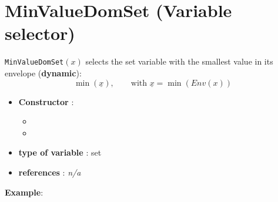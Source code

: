 \section{MinValueDomSet (Variable selector)}\label{minvaldomset:minvaldomsetvarselector}\hypertarget{minvaldomset:minvaldomsetvarselector}{}
\begin{notedef}
  \texttt{MinValueDomSet}$(x)$ selects the set variable with the smallest value in its envelope (\textbf{dynamic}):
$$\min(\underline{x}),\qquad\text{with } \underline{x}=\min(Env(x))$$
\end{notedef}

\begin{itemize}
	\item \textbf{Constructor} : 
	\begin{itemize}
	\item {}
	\item {}
	\end{itemize}	
	\item \textbf{type of variable} : set
	\item \textbf{references} : \emph{n/a}
\end{itemize}

\textbf{Example}:
%

